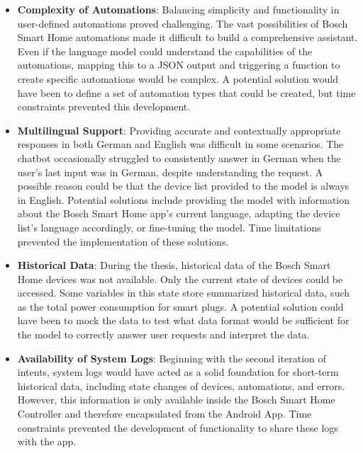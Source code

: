 \begin{itemize}
    \item \textbf{Complexity of Automations}: Balancing simplicity and functionality in user-defined automations proved challenging. The vast possibilities of Bosch Smart Home automations made it difficult to build a comprehensive assistant. Even if the language model could understand the capabilities of the automations, mapping this to a JSON output and triggering a function to create specific automations would be complex. A potential solution would have been to define a set of automation types that could be created, but time constraints prevented this development.
    
    \item \textbf{Multilingual Support}: Providing accurate and contextually appropriate responses in both German and English was difficult in some scenarios. The chatbot occasionally struggled to consistently answer in German when the user's last input was in German, despite understanding the request. A possible reason could be that the device list provided to the model is always in English. Potential solutions include providing the model with information about the Bosch Smart Home app's current language, adapting the device list's language accordingly, or fine-tuning the model. Time limitations prevented the implementation of these solutions.

    \item \textbf{Historical Data}: During the thesis, historical data of the Bosch Smart Home devices was not available. Only the current state of devices could be accessed. Some variables in this state store summarized historical data, such as the total power consumption for smart plugs. A potential solution could have been to mock the data to test what data format would be sufficient for the model to correctly answer user requests and interpret the data.

    \item \textbf{Availability of System Logs}: Beginning with the second iteration of intents, system logs would have acted as a solid foundation for short-term historical data, including state changes of devices, automations, and errors. However, this information is only available inside the Bosch Smart Home Controller and therefore encapsulated from the Android App. Time constraints prevented the development of functionality to share these logs with the app.


\end{itemize}
